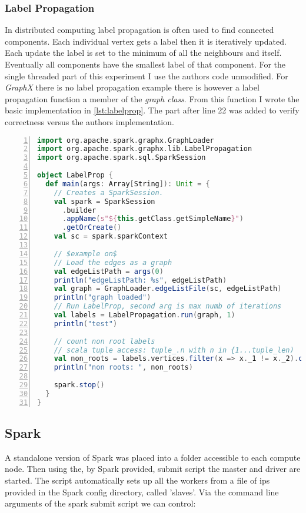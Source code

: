 \subsubsection{Label Propagation}
In distributed computing label propagation is often used to find connected components. Each individual vertex gets a label then it is iteratively updated. Each update the label is set to the minimum of all the neighbours and itself. Eventually all components have the smallest label of that component. For the single threaded part of this experiment I use the authors code unmodified. For \textit{GraphX} there is no label propagation example there is however a label propagation function a member of the \textit{graph class}. From this function I wrote the basic implementation in \cref{lst:labelprop}. The part after line 22 was added to verify correctness versus the authors implementation.

\begin{lstlisting}[caption={Scala Label Propagation for spark},language=Scala,numbers=left,breaklines=true, label={lst:labelprop}]
import org.apache.spark.graphx.GraphLoader
import org.apache.spark.graphx.lib.LabelPropagation
import org.apache.spark.sql.SparkSession

object LabelProp {
  def main(args: Array[String]): Unit = {
    // Creates a SparkSession.
    val spark = SparkSession
      .builder
      .appName(s"${this.getClass.getSimpleName}")
      .getOrCreate()
    val sc = spark.sparkContext

    // $example on$
    // Load the edges as a graph
    val edgeListPath = args(0)
    println("edgeListPath: %s", edgeListPath)
    val graph = GraphLoader.edgeListFile(sc, edgeListPath)
    println("graph loaded")
    // Run LabelProp, second arg is max numb of iterations
    val labels = LabelPropagation.run(graph, 1)
    println("test")

    // count non root labels
    // scala tuple access: tuple_.n with n in {1...tuple_len)
    val non_roots = labels.vertices.filter(x => x._1 != x._2).count()
    println("non roots: ", non_roots)

    spark.stop()
  }
}
\end{lstlisting}

\subsection{Spark}
A standalone version of Spark was placed into a folder accessible to each compute node. Then using the, by Spark provided, submit script the master and driver are started. The script automatically sets up all the workers from a file of ips provided in the Spark config directory, called 'slaves'. Via the command line arguments of the spark submit script we can control:


